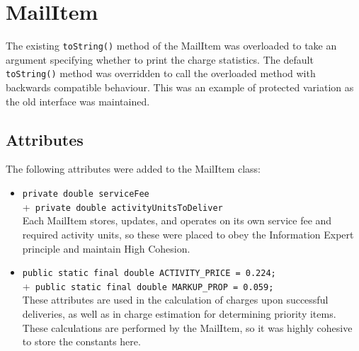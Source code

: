 \documentclass{article}
\begin{document}
\section{MailItem}
The existing \verb|toString()| method of the MailItem was overloaded to take an argument specifying whether to print the charge statistics. The default \verb|toString()| method was overridden to call the overloaded method with backwards compatible behaviour. This was an example of protected variation as the old interface was maintained.
\subsection{Attributes}
The following attributes were added to the MailItem class:
\begin{itemize}
    \item \verb|private double serviceFee|\\
         +\verb| private double activityUnitsToDeliver|\\[2mm]
    Each MailItem stores, updates, and operates on its own service fee and required activity units, so these were placed to obey the Information Expert principle and maintain High Cohesion.
    \item \verb|public static final double ACTIVITY_PRICE = 0.224;|\\
    +\verb| public static final double MARKUP_PROP = 0.059;|\\[2mm]
    These attributes are used in the calculation of charges upon successful deliveries, as well as in charge estimation for determining priority items. These calculations are performed by the MailItem, so it was highly cohesive to store the constants here.
\end{itemize}
\end{document}

